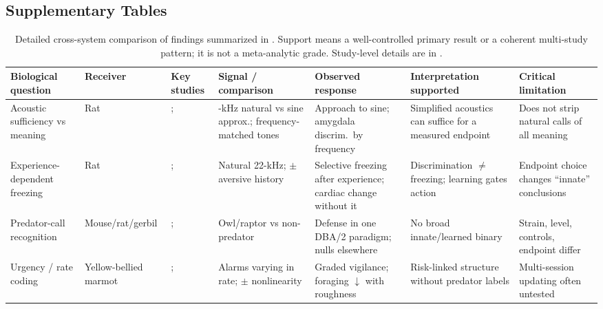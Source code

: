 \begin{landscape}
\section*{Supplementary Tables}
\begin{table}[H]
\centering
\scriptsize
\singlespacing
\setlength{\tabcolsep}{3.5pt}
\renewcommand{\arraystretch}{1.2}
\caption{Detailed cross-system comparison of findings summarized in . Support means a well-controlled primary result or a coherent multi-study pattern; it is not a meta-analytic grade. Study-level details are in .}
\label{tab:comparison-supp}
\begin{tabular}{@{}>{\raggedright\arraybackslash}p{1.05in}>{\raggedright\arraybackslash}p{0.9in}>{\raggedright\arraybackslash}p{1.25in}>{\raggedright\arraybackslash}p{1.3in}>{\raggedright\arraybackslash}p{1.3in}>{\raggedright\arraybackslash}p{1.25in}>{\raggedright\arraybackslash}p{1.2in}@{}}
\toprule
\textbf{Biological question} & \textbf{Receiver} & \textbf{Key studies} & \textbf{Signal / comparison} & \textbf{Observed response} & \textbf{Interpretation supported} & \textbf{Critical limitation} \\
\midrule
Acoustic sufficiency vs meaning & Rat & \citet{WohrSchwarting2007}; \citet{ParsanaEtAl2012a} & 50-kHz natural vs sine approx.; frequency-matched tones & Approach to sine; amygdala discrim.\ by frequency & Simplified acoustics can suffice for a measured endpoint & Does not strip natural calls of all meaning \\
\rowcolor{black!5}Experience-dependent freezing & Rat & \citet{KimEtAl2010}; \citet{OlszynskiEtAl2020} & Natural 22-kHz; $\pm$ aversive history & Selective freezing after experience; cardiac change without it & Discrimination $\neq$ freezing; learning gates action & Endpoint choice changes ``innate'' conclusions \\
Predator-call recognition & Mouse/rat/gerbil & \citet{HendrieNeill1991}; \citet{KindermannEtAl2009} & Owl/raptor vs non-predator & Defense in one DBA/2 paradigm; nulls elsewhere & No broad innate/learned binary & Strain, level, controls, endpoint differ \\
\rowcolor{black!5}Urgency / rate coding & Yellow-bellied marmot & \citet{BlumsteinArmitage1997}; \citet{BlumsteinRecapet2009} & Alarms varying in rate; $\pm$ nonlinearity & Graded vigilance; foraging $\downarrow$ with roughness & Risk-linked structure without predator labels & Multi-session updating often untested \\

\end{tabular}
\end{table}
\end{landscape}
